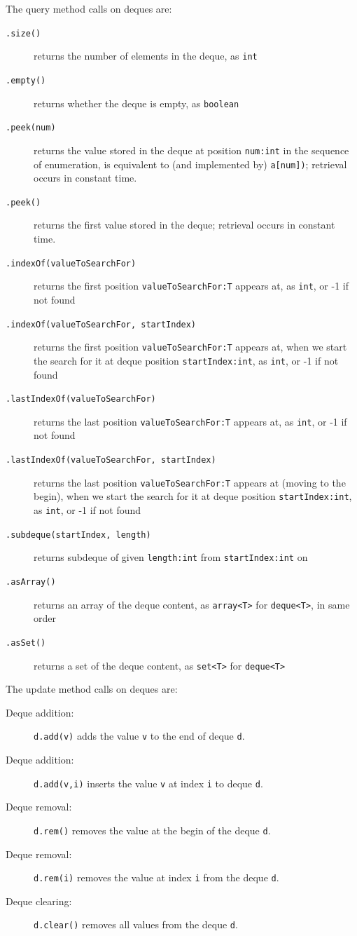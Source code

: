 \noindent The query method calls on deques are:

\begin{description}
\item[\texttt{.size()}] returns the number of elements in the deque, as \texttt{int}
\item[\texttt{.empty()}] returns whether the deque is empty, as \texttt{boolean}
\item[\texttt{.peek(num)}] returns the value stored in the deque at position \texttt{num:int} in the sequence of enumeration, is equivalent to (and implemented by) \texttt{a[num])}; retrieval occurs in constant time.
\item[\texttt{.peek()}] returns the first value stored in the deque; retrieval occurs in constant time.
\item[\texttt{.indexOf(valueToSearchFor)}] returns the first position \texttt{valueToSearchFor:T} appears at, as \texttt{int}, or -1 if not found
\item[\texttt{.indexOf(valueToSearchFor, startIndex)}] returns the first position \texttt{valueToSearchFor:T} appears at, when we start the search for it at deque position \texttt{startIndex:int}, as \texttt{int}, or -1 if not found
\item[\texttt{.lastIndexOf(valueToSearchFor)}] returns the last position \texttt{valueToSearchFor:T} appears at, as \texttt{int}, or -1 if not found
\item[\texttt{.lastIndexOf(valueToSearchFor, startIndex)}] returns the last position \texttt{valueToSearchFor:T} appears at (moving to the begin), when we start the search for it at deque position \texttt{startIndex:int}, as \texttt{int}, or -1 if not found
\item[\texttt{.subdeque(startIndex, length)}] returns subdeque of given \texttt{length:int} from \texttt{startIndex:int} on
\item[\texttt{.asArray()}] returns an array of the deque content, as \verb#array<T># for \verb#deque<T>#, in same order
\item[\texttt{.asSet()}] returns a set of the deque content, as \verb#set<T># for \verb#deque<T>#
\end{description}

\noindent The update method calls on deques are:

\begin{description}
\item[Deque addition:] \texttt{d.add(v)} adds the value \texttt{v} to the end of deque \texttt{d}.
\item[Deque addition:] \texttt{d.add(v,i)} inserts the value \texttt{v} at index \texttt{i} to deque \texttt{d}.
\item[Deque removal:] \texttt{d.rem()} removes the value at the begin of the deque \texttt{d}.
\item[Deque removal:] \texttt{d.rem(i)} removes the value at index \texttt{i} from the deque \texttt{d}.
\item[Deque clearing:] \texttt{d.clear()} removes all values from the deque \texttt{d}.
\end{description}

